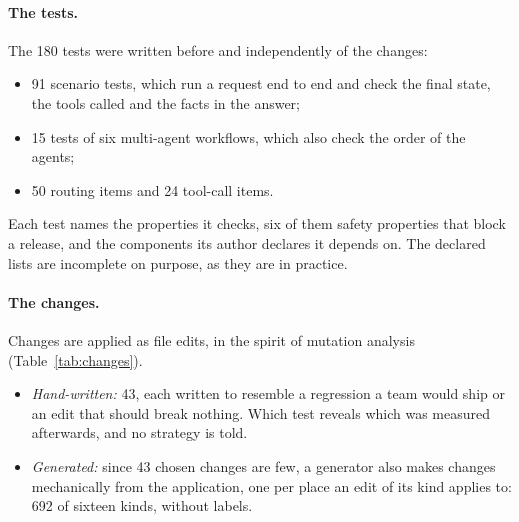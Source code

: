 \documentclass[11pt,a4paper]{article}
\begin{document}
\paragraph{The tests.} The 180 tests were written before and independently of the changes:
\begin{itemize}
  \item 91 scenario tests, which run a request end to end and check the final state, the tools called and the
        facts in the answer;
  \item 15 tests of six multi-agent workflows, which also check the order of the agents;
  \item 50 routing items and 24 tool-call items.
\end{itemize}
Each test names the properties it checks, six of them safety properties that block a release, and the components
its author declares it depends on. The declared lists are incomplete on purpose, as they are in practice.

\paragraph{The changes.} Changes are applied as file edits, in the spirit of mutation analysis
\cite{demillo1978hints,jia2011analysis} (Table~\ref{tab:changes}).
\begin{itemize}
  \item \emph{Hand-written:} 43, each written to resemble a regression a team would ship or an edit that should
        break nothing. Which test reveals which was measured afterwards, and no strategy is told.
  \item \emph{Generated:} since 43 chosen changes are few, a generator also makes changes mechanically from the
        application, one per place an edit of its kind applies to: 692 of sixteen kinds, without labels.
\end{itemize}
\end{document}

